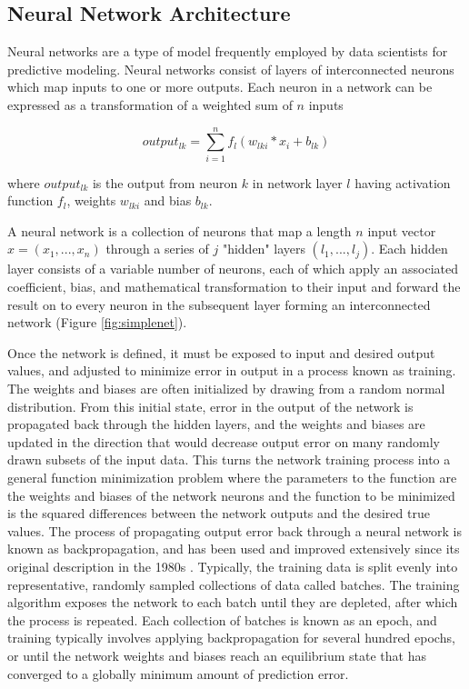 \subsection*{Neural Network Architecture} \label{ssec:neuralnets}

Neural networks are a type of model frequently employed by data scientists
for predictive modeling. Neural networks consist of layers of interconnected neurons
which map inputs to one or more outputs. Each neuron in a network can be expressed as a 
transformation of a weighted sum of $n$ inputs 

\begin{equation}
output_{lk} = \sum_{i=1}^{n} f_l(w_{lki} * x_{i} + b_{lk})
\label{eq:neuron}
\end{equation}

where $output_{lk}$ is the output from neuron $k$ in network layer $l$ having activation
function $f_l$, weights $w_{lki}$ and bias $b_{lk}$.

A neural network is a collection of neurons that map a 
length $n$ input vector $x = (x_1, ..., x_n)$ through a series of $j$ 
"hidden" layers $(l_1, ..., l_j)$. Each hidden layer consists of a variable 
number of neurons, each of which apply an associated coefficient, bias, and 
mathematical transformation to their input and forward the 
result on to every neuron in the subsequent layer forming an interconnected
network (Figure \ref{fig:simplenet}).

\ifdefined\showtablesandfigures
\fi

Once the network is defined, it must be exposed to input and desired output
values, and adjusted to minimize error in output in a process known as training.
The weights and biases are often initialized by drawing from a
random normal distribution. From this initial state, error in 
the output of the network is propagated back through the hidden 
layers, and the weights and biases are updated in the direction that would 
decrease output error on many randomly drawn subsets of the input data. 
This turns the network training process into a general 
function minimization problem where the parameters to the function are the 
weights and biases of the network neurons and the function to be 
minimized is the squared differences between the network outputs and 
the desired true values. The process of propagating output error back 
through a neural network is known as backpropagation, and has been used 
and improved extensively since its original description in the 
1980s \citep{rumelhart1986}.  Typically, the training data is split 
evenly into representative, randomly sampled collections of data 
called batches. The training algorithm exposes the network to each 
batch until they are depleted, after which the process is repeated. Each 
collection of batches is known as an epoch, and training typically
involves applying backpropagation for several hundred epochs, or until the network
weights and biases reach an equilibrium state that has converged to a 
globally minimum amount of prediction error.

